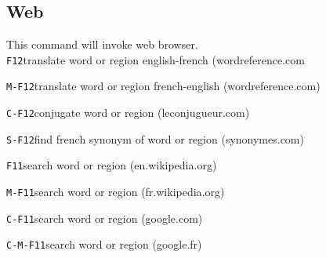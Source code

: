 \documentclass[10pt,landscape]{article}
\def\cm#1#2{{\tt#1}\dotfill#2\par}
\begin{document}
\begin{multicols}{3}
\subsection{Web}
This command will invoke web browser.\\
\cm{F12}{translate word or region english-french (wordreference.com}
\cm{M-F12}{translate word or region french-english (wordreference.com)}
\cm{C-F12}{conjugate word or region (leconjugueur.com)}
\cm{S-F12}{find french synonym of word or region (synonymes.com)}
\cm{F11}{search word or region (en.wikipedia.org)}
\cm{M-F11}{search word or region (fr.wikipedia.org)}
\cm{C-F11}{search word or region (google.com)}
\cm{C-M-F11}{search word or region (google.fr)}




\end{multicols}
\end{document}
